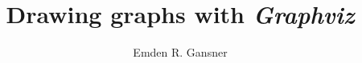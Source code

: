 \documentclass[11pt]{article}
\date{\lastedited}
\def\gviz{{\it Graphviz}}
\begin{document}

\author{Emden R. Gansner}
\title{Drawing graphs with \gviz}
\maketitle

\newpage
\tableofcontents
\newpage












%

%

\clearpage


\appendix
\clearpage



\end{document}

